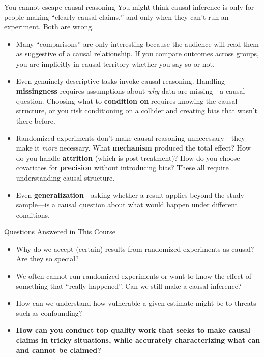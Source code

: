 \documentclass[handout,xcolor=dvipsnames,pdftex,hyperref={colorlinks=false}]{beamer}
\newcommand\makebiggaps{\addtolength{\itemsep}{.5\baselineskip}}
\begin{document}
\begin{frame}{You cannot escape causal reasoning}
\footnotesize
{} You might think causal inference is only for people making ``clearly causal claims,'' and only when they can't run an experiment. Both are wrong.\\
\medskip
\begin{itemize}
\item<2-> Many ``comparisons'' are only interesting because the audience will read them as suggestive of a causal relationship. If you compare outcomes across groups, you are implicitly in causal territory whether you say so or not.
\medskip
\item<3-> Even genuinely descriptive tasks invoke causal reasoning. Handling \textbf{missingness} requires assumptions about \textit{why} data are missing---a causal question. Choosing what to \textbf{condition on} requires knowing the causal structure, or you risk conditioning on a collider and creating bias that wasn't there before.
\medskip
\item<4-> Randomized experiments don't make causal reasoning unnecessary---they make it \textit{more} necessary. What \textbf{mechanism} produced the total effect? How do you handle \textbf{attrition} (which is post-treatment)? How do you choose covariates for \textbf{precision} without introducing bias? These all require understanding causal structure.
\medskip
\item<5-> Even \textbf{generalization}---asking whether a result applies beyond the study sample---is a causal question about what would happen under different conditions.
\end{itemize}
\end{frame}

\begin{frame}{Questions Answered in This Course}
\begin{itemize}
\makebiggaps

\item<1-> Why do we accept (certain) results from randomized experiments as causal? Are they so special?

\item<2-> We often cannot run randomized experiments or want to know the effect of something that ``really happened''. Can we still make a causal inference?

\item<3-> How can we understand how vulnerable a given estimate might be to threats such as confounding?

\item<4-> \textbf{How can you conduct top quality work that seeks to make causal claims in tricky situations, while accurately characterizing what can and cannot be claimed?}
\end{itemize}
\end{frame}
\end{document}
